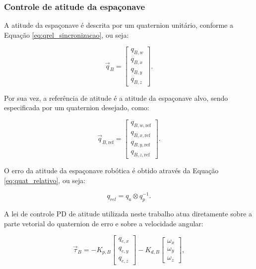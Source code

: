 \subsubsection{Controle de atitude da espaçonave}
\label{sec:controle_PD_atitude}

A atitude da espaçonave é descrita por um quaternion unitário, conforme a Equação \eqref{eq:qrel_sincronizacao}, ou seja:

\begin{equation}
\vec q_B =
\begin{bmatrix}
q_{B,w} \\
q_{B,x} \\
q_{B,y} \\
q_{B,z}
\end{bmatrix}.
\end{equation}

Por sua vez, a referência de atitude é a atitude da espaçonave alvo, sendo especificada por um quaternion desejado, como:

\begin{equation}
\vec q_{B,\text{ref}} =
\begin{bmatrix}
q_{B,w,\text{ref}} \\
q_{B,x,\text{ref}} \\
q_{B,y,\text{ref}} \\
q_{B,z,\text{ref}}
\end{bmatrix}.
\end{equation}

O erro da atitude da espaçonave robótica é obtido através da Equação \eqref{eq:quat_relativo}, ou seja:

\begin{equation}
\label{eq:controle_PD_quat}
q_{rel} =
q_a \otimes q_p^{-1}.
\end{equation}

A lei de controle PD de atitude utilizada neste trabalho atua diretamente sobre a parte vetorial do quaternion de erro e sobre a velocidade angular:

\begin{equation}
\vec\tau_B=
-K_{p,B}
\begin{bmatrix}
q_{e,x} \\
q_{e,y} \\
q_{e,z}
\end{bmatrix}
-K_{d,B}
\begin{bmatrix}
\omega_x \\
\omega_y \\
\omega_z
\end{bmatrix},
\label{eq:controle_PD_atitude}
\end{equation}

